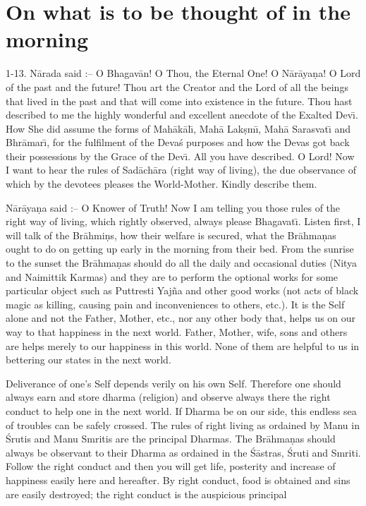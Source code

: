 \chapter{On what is to be thought of in the morning}

1-13. N\=arada said :-- O Bhagav\=an! O Thou, the Eternal One! O N\=ar\=aya\d{n}a! O Lord of the past and the future! Thou art the Creator and the Lord of all the beings that lived in the past and that will come into existence in the future. Thou hast described to me the highly wonderful and excellent anecdote of the Exalted Dev\={\i}. How She did assume the forms of Mah\=ak\=al\={\i}, Mah\=a Lak\d{s}m\={\i}, Mah\=a Sarasvat\={\i} and Bhr\=amar\={\i}, for the fulfilment of the Deva\'s purposes and how the Devas got back their possessions by the Grace of the Dev\={\i}. All you have described. O Lord! Now I want to hear the rules of Sad\=ach\=ara (right way of living), the due observance of which by the devotees pleases the World-Mother. Kindly describe them.

N\=ar\=aya\d{n}a said :-- O Knower of Truth! Now I am telling you those rules of the right way of living, which rightly observed, always please Bhagavat\={\i}. Listen first, I will talk of the Br\=ahmi\d{n}s, how their welfare is secured, what the Br\=ahma\d{n}as ought to do on getting up early in the morning from their bed. From the sunrise to the sunset the Br\=ahma\d{n}as should do all the daily and occasional duties (Nitya and Naimittik Karmas) and they are to perform the optional works for some particular object such as Puttresti Yaj\~na and other good works (not acts of black magic as killing, causing pain and inconveniences to others, etc.). It is the Self alone and not the Father, Mother, etc., nor any other body that, helps us on our way to that happiness in the next world. Father, Mother, wife, sons and others are helps merely to our happiness in this world. None of them are helpful to us in bettering our states in the next world.

Deliverance of one's Self depends verily on his own Self. Therefore one should always earn and store dharma (religion) and observe always there the right conduct to help one in the next world. If Dharma be on our side, this endless sea of troubles can be safely crossed. The rules of right living as ordained by Manu in \'Srutis and Manu Smritis are the principal Dharmas. The Br\=ahma\d{n}as should always be observant to their Dharma as ordained in the \'S\=astras, \'Sruti and Smriti. Follow the right conduct and then you will get life, posterity and increase of happiness easily here and hereafter. By right conduct, food is obtained and sins are easily destroyed; the right conduct is the auspicious principal

